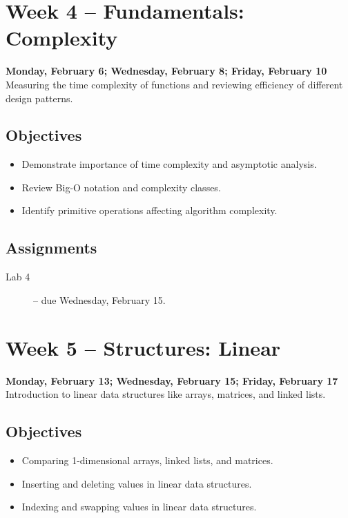\documentclass[10pt]{memoir}
\begin{document}
\section{Week 4 -- Fundamentals: Complexity}
\textcolor{CUGold}{\textbf{Monday, February 6; Wednesday, February 8; Friday, February 10}}\\
Measuring the time complexity of functions and reviewing efficiency of different design patterns.

    \subsection{Objectives}
    \begin{itemize}
        \item Demonstrate importance of time complexity and asymptotic analysis.
        \item Review Big-O notation and complexity classes.
        \item Identify primitive operations affecting algorithm complexity.
    \end{itemize}

    \subsection{Assignments}
    \begin{description}
        \item[Lab 4 ] -- due Wednesday, February 15. %
    \end{description}

\section{Week 5 -- Structures: Linear}
\textcolor{CUGold}{\textbf{Monday, February 13; Wednesday, February 15; Friday, February 17}}\\
Introduction to linear data structures like arrays, matrices, and linked lists.

    \subsection{Objectives}
    \begin{itemize}
        \item Comparing 1-dimensional arrays, linked lists, and matrices.
        \item Inserting and deleting values in linear data structures.
        \item Indexing and swapping values in linear data structures.
    \end{itemize}
\end{document}

